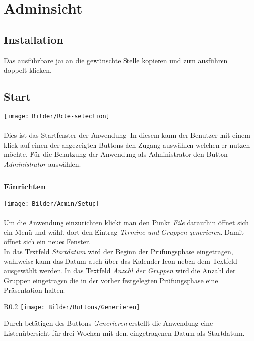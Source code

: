 \section{Adminsicht}

\subsection{Installation}
Das ausführbare jar an die gewünschte Stelle kopieren und zum ausführen doppelt klicken.


\subsection{Start}
	\texttt{[image: Bilder/Role-selection]}
	\\
	\\
Dies ist das Startfenster der Anwendung. In diesem kann der Benutzer mit einem klick auf einen der angezeigten Buttons den Zugang auswählen welchen er nutzen möchte. Für die Benutzung der Anwendung als Administrator den Button \textit{Administrator} auswählen. 



\subsubsection{Einrichten}
	\texttt{[image: Bilder/Admin/Setup]}
	\\
	\\
Um die Anwendung einzurichten klickt man den Punkt \textit{File} daraufhin öffnet sich ein Menü und wählt dort den Eintrag \textit{Termine und Gruppen generieren}. Damit öffnet sich ein neues Fenster. \\In das Textfeld \textit{Startdatum} wird der Beginn der Prüfungsphase eingetragen, wahlweise kann das Datum auch über das Kalender Icon neben dem Textfeld ausgewählt werden. In das Textfeld \textit{Anzahl der Gruppen} wird die Anzahl der Gruppen eingetragen die in der vorher festgelegten Prüfungsphase eine Präsentation halten. 
\\
\begin{wrapfigure}{R}{0.2\textwidth}
	\centering
	\texttt{[image: Bilder/Buttons/Generieren]}
\end{wrapfigure}

Durch betätigen des Buttons \textit{Generieren} erstellt die Anwendung eine Listenübersicht für drei Wochen mit dem eingetragenen Datum als Startdatum.


